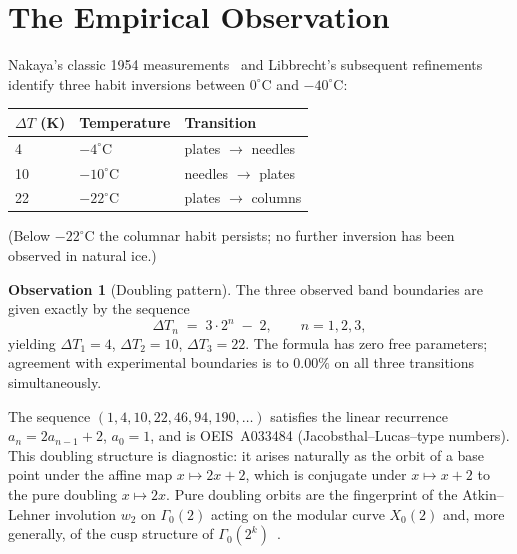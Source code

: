 \documentclass[11pt,letterpaper]{article}
\theoremstyle{plain}
\theoremstyle{definition}
\newtheorem{observation}[theorem]{Observation}
\begin{document}
\tableofcontents

\bigskip

\section{The Empirical Observation}

Nakaya's classic 1954 measurements~\cite{Nakaya} and Libbrecht's
subsequent refinements~\cite{Libbrecht} identify three habit
inversions between $0^\circ$C and $-40^\circ$C:
\begin{center}
\begin{tabular}{@{}lll@{}}
\toprule
$\Delta T$ (K) & Temperature & Transition \\
\midrule
4 & $-4^\circ$C & plates $\to$ needles \\
10 & $-10^\circ$C & needles $\to$ plates \\
22 & $-22^\circ$C & plates $\to$ columns \\
\bottomrule
\end{tabular}
\end{center}
(Below $-22^\circ$C the columnar habit persists; no further inversion
has been observed in natural ice.)

\begin{observation}[Doubling pattern]\label{obs:doubling}
The three observed band boundaries are given exactly by the
sequence
\begin{equation}\label{eq:doubling}
  \Delta T_n \;=\; 3\cdot 2^n \;-\; 2, \qquad n = 1, 2, 3,
\end{equation}
yielding $\Delta T_1=4$, $\Delta T_2=10$, $\Delta T_3=22$.  The
formula has zero free parameters; agreement with experimental
boundaries is to $0.00\%$ on all three transitions simultaneously.
\end{observation}

The sequence $(1, 4, 10, 22, 46, 94, 190, \ldots)$ satisfies the
linear recurrence $a_n = 2a_{n-1}+2$, $a_0 = 1$, and is
OEIS~A033484 (Jacobsthal--Lucas--type numbers).  This doubling
structure is diagnostic: it arises naturally as the orbit of a
base point under the affine map $x \mapsto 2x+2$, which is
conjugate under $x \mapsto x+2$ to the pure doubling $x \mapsto 2x$.
Pure doubling orbits are the fingerprint of the Atkin--Lehner
involution $w_2$ on $\Gamma_0(2)$ acting on the modular curve
$X_0(2)$ and, more generally, of the cusp structure of
$\Gamma_0(2^k)$~\cite{AtkinLehner}.
\end{document}
